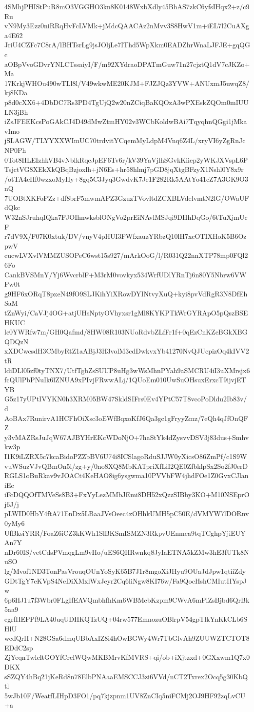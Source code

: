 4SMhjPHIStPuR8mO3VGGHO3kn8K0148WxbXdly45BhAS7zkC6yfsIHqx2+z/c9Ru
vN9My3Ezz0niRRqHvFcLVMk+jMdcQAACAz2nMvv3S8HwV1m+iEL7l2CuAXga4E62
JriU4CZFc7C8rA/lBHTsrLg9jsJOljLe7IThd5WpXkm0EADZhrWnaLJFJE+gqQGc
aOBpVvoGDvrYNLCTssaiyI/F/m92XYdraoDPATmGuw71n27cjztQ1dV7cJKZo+Ma
17KrkjWHOu490wTLl8l/V49wkwME20KJM+FJZJQz3YVW+ANUxmJ5uwqZ8/kj8KDa
p8d0cXX6+4DbDC7Rs3PD4TgUjQ2w20nZCiqBaKQOzA3wPXEskZQOm0mIUULN3jBh
iZsJFEEKcsPoGAkCJ4D49dMwZtmHY02v3WCbKoldwBAi7TqyqhnQGgi1jMkavImo
jSLAGW/TLYYXXWImUC70trdvitYCqemMyLdpM4Vnq6Z4L/xryVI6yZgRnJcNP0Ph
0Tot8HLEIzhkVB4vNblkRqeJpEF6Tv6r/kV39YaVjlhSGvkKiiep2yWKJXVspL6P
TsjctVG8XEkXkQBqBzjoxlh+jN6Es+hr58hlmj7pGD8jqXtgBFzyX1Nshl0Y8x9r
/otTA4cHf0wzxoMyHy+8gq5C3Jyq3GwdvK7Je1F282Rk5AAtYo41cZ7A3GK9O3nQ
7UOBtXKFoPZz+df8brF5mwmAPZ3GzuzTVovltdZCXBLVdelvmtN2lG/OWaUFdQkc
W32nSJruhqIQka7FJOIhnwksblONgVo2prEiNAvlMSJqi9DHhDqGo/6tTuXjmUcF
r7dV9X/F07K0xtuk/DV/vnyV4pHUI3FWfxauzYRbzQ10lH7xcOTIXHoK5B6OzpwV
cucwLVXvlVMMZUSOPeC6wst15s927/mArkOoG/l/R031Q22nnXTP78mp0FQl26Fo
CankBVSMnY/Yj6WvcrblF+M3rM0vovkyx534WrfUDlYRnTj6n80Y5Nbrw6VWPw0t
g9HF6xORqT8pxeN49fO9SLJKihYiXRowDYINtvyXuQ+kyi8pvVdRgR3N8DfEhSaM
tZnWyi/CaVJj4OG+atjUHsNptyOVhyxsr1gMl8KYKPTkWrGYRApO5pQszBSEHKUC
lc0YWRfw7m/GH0Qafmd/8HW08R103NUoRdvbZLfFr1f+0qEzCnKZcBGkXBGQDQzN
xXDCwcsdH3CMbyRtZ1aABjJ3H3volM3cdDwkvxYb41270NvQJUcpizOq4kIVV2tR
ldiDLl05zf0tyTNX7/UtfTgbZsSUUP8uHg3wWsMhnPYah9aSMCRU4iI3uXMrsjx6
fcQUlPbPNuIk6lZNUA9xPIvjFRwwALj/1QUoEm010UwSuOHsuxErxcT9ijvjETYB
G5z17yUPtIVYKN0h3XRM05BW47SkldSIFrs0Ev4YPtC57T8vcoPoDldu2Ib83v/d
AoBAx7RunirvA1HCFhOiXsc3oEWfBqxoKfJ6Qa3gc1gFryyZmz/7eQh4qJfOnQFZ
y3vMAZRsJuJqW67AJBYHrEKcWDoNjO+7haStYk4dZysvvDSV3j83dus+Smhvkw3p
I1K9iLZRX5c7kcaBidoPZZbBV6U74i8ICSlagoRduSJJW0yXicsO86ZmPf/c1S9W
vuWSuzVJvQBmOn5l/zg+y/0no8XQ8MbKATpriXfLiI2QE0ZfbklpSx2So2fJ0erD
RGLS1oBuRkav9vJOACt4KeHAO8ig6ysgwma10PVVbFW4jhdFOe1Z0GvxCJlaniEc
iFcDQQOfTMVeSs8B3+FxYyLezMMbJEmi8DH52xQzzSIBby3KO+M10NSEprOj6J/j
pLWID0HbY4ftA71EnDx5LBaaJVsOeec4zOHhkUMH5pC50E/dVMYW7lDORnv0yMy6
UfBksiYRR/FoaZ6iCZ3kKWh1SlBKSmISMZN3RkpvUEnmea9tqTCghpYjiEUYAn7Y
nDr60IS/vetCdsPVmqgLm9vHo/uES6QHRwnkq8JyIaETNA5kZMw3hE3fUTk8NuSO
lg/Mvof1ND3TonPasVrouqOUnYoSyK65B7J1r8mgoXiJHyu9OUaJdJpw1qtiiZdy
GDtTgY7eKVpS4NeDiXMxlWxJeyr2Cq6liNgw8KI76w/Fa9QocHshCMIutIIYspJw
6p6HJ1u7f3Wbr0FLgIfEAVQmbhfhKm6WBMebKzpm9CWvA6mPlZsBjbd6QrBk5aa9
egrfHEPPf9LA40uqUDHKQTzUQ+04rw577EmnozuOBlrpV54gpTlkYnKkCLb6SHlU
wcdQrH+N28GSa6dmqUBbAxIZ8i4hOwBGWy4Wr7TbGlvAh9ZUUWZTCTOT8EDdC2sp
ZjYeqnTwlcltGOYfCrclWQwMKBMrvKfMVRS+qi/ob+iXjtzxd+0GXxwm1Q7x0DKX
sSZQY4hBq21jKeRd8n78ElbPNAaaEMSCCJ3zi6VVd/nCT2Txrex2Ocq5g30KbQtl
5wJb10F/WeatfLIHpD3FO1/pq7kjzpnm1UV8ZnCIq5niFCMj2OJ9HF92zqLvCU+a
